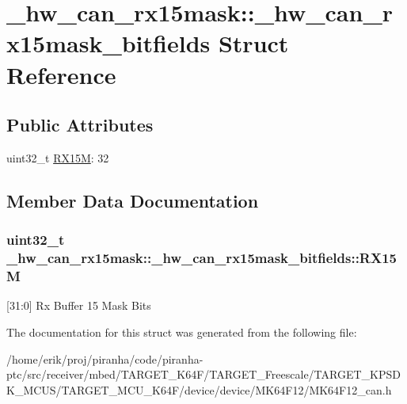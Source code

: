 \hypertarget{struct__hw__can__rx15mask_1_1__hw__can__rx15mask__bitfields}{}\section{\+\_\+hw\+\_\+can\+\_\+rx15mask\+:\+:\+\_\+hw\+\_\+can\+\_\+rx15mask\+\_\+bitfields Struct Reference}
\label{struct__hw__can__rx15mask_1_1__hw__can__rx15mask__bitfields}
\subsection*{Public Attributes}
\begin{DoxyCompactItemize}
\item 
uint32\+\_\+t \hyperlink{struct__hw__can__rx15mask_1_1__hw__can__rx15mask__bitfields_ab3d0535430580b44c0bab15f6dac9b94}{R\+X15M}\+: 32
\end{DoxyCompactItemize}


\subsection{Member Data Documentation}
\subsubsection[{\texorpdfstring{R\+X15M}{RX15M}}]{\setlength{\rightskip}{0pt plus 5cm}uint32\+\_\+t \+\_\+hw\+\_\+can\+\_\+rx15mask\+::\+\_\+hw\+\_\+can\+\_\+rx15mask\+\_\+bitfields\+::\+R\+X15M}\hypertarget{struct__hw__can__rx15mask_1_1__hw__can__rx15mask__bitfields_ab3d0535430580b44c0bab15f6dac9b94}{}\label{struct__hw__can__rx15mask_1_1__hw__can__rx15mask__bitfields_ab3d0535430580b44c0bab15f6dac9b94}
\mbox{[}31\+:0\mbox{]} Rx Buffer 15 Mask Bits 

The documentation for this struct was generated from the following file\+:\begin{DoxyCompactItemize}
\item 
/home/erik/proj/piranha/code/piranha-\/ptc/src/receiver/mbed/\+T\+A\+R\+G\+E\+T\+\_\+\+K64\+F/\+T\+A\+R\+G\+E\+T\+\_\+\+Freescale/\+T\+A\+R\+G\+E\+T\+\_\+\+K\+P\+S\+D\+K\+\_\+\+M\+C\+U\+S/\+T\+A\+R\+G\+E\+T\+\_\+\+M\+C\+U\+\_\+\+K64\+F/device/device/\+M\+K64\+F12/M\+K64\+F12\+\_\+can.\+h\end{DoxyCompactItemize}
